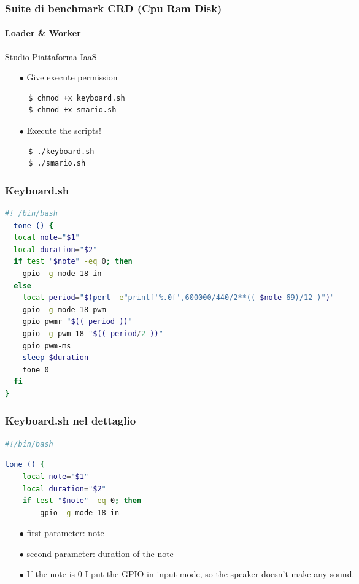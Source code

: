 \documentclass{beamer}
\begin{document}

\begin{frame}[fragile]
	\frametitle{\textbf{Suite di benchmark CRD (Cpu Ram Disk)}}
	\framesubtitle{\textbf{Loader \& Worker}}

	\begin{block}{Studio Piattaforma IaaS}
		\begin{itemize}
			\item[$\bullet$] Give execute permission
			\begin{lstlisting}
  $ chmod +x keyboard.sh
  $ chmod +x smario.sh
			\end{lstlisting}
			\item[$\bullet$] Execute the scripts!
			\begin{lstlisting}
  $ ./keyboard.sh
  $ ./smario.sh
			\end{lstlisting}
		\end{itemize}
	\end{block}
\end{frame}



\begin{frame}[fragile]
	\frametitle{\textbf{Keyboard.sh}}
			\begin{lstlisting}[language=bash]
  #! /bin/bash
  tone () {
  local note="$1"
  local duration="$2"
  if test "$note" -eq 0; then
    gpio -g mode 18 in
  else
    local period="$(perl -e"printf'%.0f',600000/440/2**(( $note-69)/12 )")"
    gpio -g mode 18 pwm
    gpio pwmr "$(( period ))"
    gpio -g pwm 18 "$(( period/2 ))"
    gpio pwm-ms
    sleep $duration
    tone 0
  fi
}

			\end{lstlisting}
\end{frame}



\begin{frame}[fragile]
	\frametitle{\textbf{Keyboard.sh nel dettaglio}}
		\begin{lstlisting}[language=bash]
  #!/bin/bash
  		\end{lstlisting}
  \begin{lstlisting}[language=bash]
  tone () {
  	local note="$1"
  	local duration="$2"
  	if test "$note" -eq 0; then
    	gpio -g mode 18 in
  \end{lstlisting}
  \begin{itemize}
  	\item[$\bullet$] first parameter: note
  	\item[$\bullet$] second parameter: duration of the note
  	\item[$\bullet$] If the note is 0 I put the GPIO in input mode, so the speaker doesn’t make any sound. 
  \end{itemize}
\end{frame}
\end{document}
